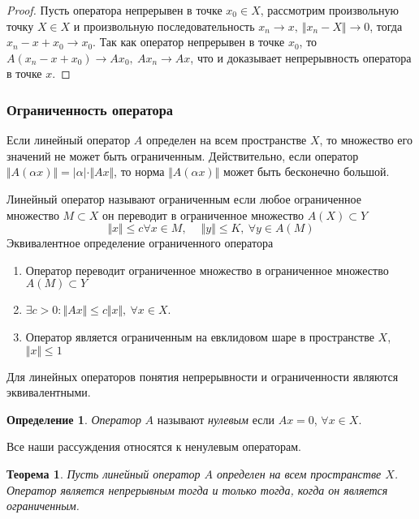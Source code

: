 \documentclass[14pt,a4paper]{extarticle}
\newtheorem{theorem}{Теорема}[section]
\theoremstyle{definition}
\newtheorem{definition}{Определение}[section]
\theoremstyle{remark}
\renewcommand{\[}{\begin{dmath*}[compact]}
\renewcommand{\]}{\end{dmath*}}
\newcommand{\be}{\begin{enumerate}}
\newcommand{\ee}{\end{enumerate}}
\newcommand{\sep}{ , \ \allowbreak }
\begin{document}
\begin{proof}
  Пусть оператора непрерывен в точке $x_0 \in X$, рассмотрим произвольную точку
  $X \in X$ и произвольную последовательность
  $x_n \to x \sep \Vert x_n - X \Vert \to 0$, тогда $x_n - x + x_0 \to x_0$.
  Так как оператор непрерывен в точке $x_0$,
  то $A(x_n-x+x_0) \to Ax_0 \sep Ax_n \to Ax$,
  что и доказывает непрерывность оператора в точке $x$.
\end{proof}

\subsubsection{Ограниченность оператора}

Если линейный оператор $A$ определен на всем пространстве $X$,
то множество его значений не может быть ограниченным.
Действительно, если оператор
$\Vert A (\alpha x) \Vert = |\alpha| \cdot \Vert Ax \Vert$,
то норма $\Vert A (\alpha x) \Vert$ может быть бесконечно большой.

Линейный оператор называют ограниченным если любое ограниченное множество
$M \subset X$ он переводит в ограниченное множество $A (X) \subset Y$
\[\Vert x \Vert \leq c \forall x \in M \sep \quad
\Vert y \Vert \leq K \sep \forall y \in A (M)\]
Эквивалентное определение ограниченного оператора

\be
  \item Оператор переводит ограниченное множество в ограниченное множество
  $A(M) \subset Y$

  \item $\exists c > 0: \Vert Ax \Vert \leq c \Vert x \Vert \sep
  \forall x \in X$.

  \item Оператор является ограниченным на евклидовом шаре в пространстве $X$,
  $\Vert x \Vert \leq 1$
\ee

Для линейных операторов понятия непрерывности и ограниченности являются
эквивалентными.

\begin{definition}
  \textit{Оператор} $A$ называют \textit{нулевым} если $Ax=0$,
  $\forall x \in X$.
\end{definition}

Все наши рассуждения относятся к ненулевым операторам.

\begin{theorem}
  Пусть линейный оператор $A$ определен на всем пространстве $X$.
  Оператор является непрерывным тогда и только тогда, когда он является
  ограниченным.
\end{theorem}
\end{document}
